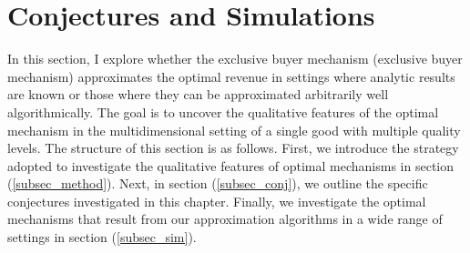\documentclass{article}
\DeclareMathOperator*{\argmax}{arg\,max}
\begin{document}




\section{Conjectures and Simulations}\label{sec_sim}


In this section, I explore whether the exclusive buyer mechanism (exclusive buyer mechanism) approximates the optimal revenue in settings where analytic results are known or those where they can be approximated arbitrarily well algorithmically. The goal is to uncover the qualitative features of the optimal mechanism in the multidimensional setting of a single good with multiple quality levels. The structure of this section is as follows. First, we introduce the strategy adopted to investigate the qualitative features of optimal mechanisms in section (\ref{subsec_method}). Next, in section (\ref{subsec_conj}), we outline the specific conjectures investigated in this chapter. Finally, we investigate the optimal mechanisms that result from our approximation algorithms in a wide range of settings in section (\ref{subsec_sim}).
\end{document}
